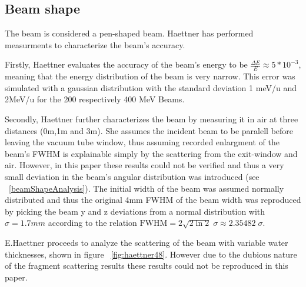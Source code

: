 \subsection{Beam shape}


The beam is considered a pen-shaped beam. Haettner has performed measurments to characterize the beam's accuracy.

Firstly, Haettner evaluates the accuracy of the beam's energy to be $\frac{\Delta E}{E}\approx5*10^{-3}$, meaning that the energy distribution of the beam is very narrow. This error was simulated with a gaussian distribution with the standard deviation 1 meV/u and 2MeV/u for the 200 respectively 400 MeV Beams.

Secondly, Haettner further characterizes the beam by measuring it in air at three distances (0m,1m and 3m). She assumes the incident beam to be paralell before leaving the vacuum tube window, thus assuming recorded enlargment of the beam's FWHM is explainable simply by the scattering from the exit-window and air. However, in this paper these results could not be verified and thus a very small deviation in the beam's angular distribution was introduced (see ~\ref{beamShapeAnalysis}). The initial width of the beam was assumed normally distributed and thus the original 4mm FWHM of the beam width was reproduced by picking the beam y and z deviations from a normal distribution with $\sigma = 1.7mm$ according to the relation $\mathrm{FWHM} =   2 \sqrt{2 \ln 2 } \; \sigma \approx 2.35482 \; \sigma$.

E.Haettner proceeds to analyze the scattering of the beam with variable water thicknesses, shown in figure ~\ref{fig:haettner48}. However due to the dubious nature of the fragment scattering results these results could not be reproduced in this paper.


